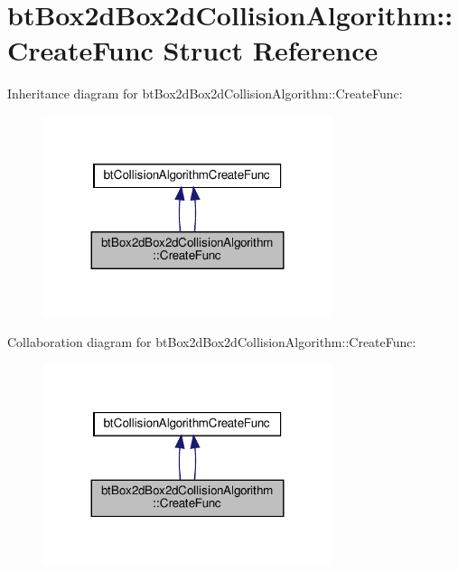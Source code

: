 \hypertarget{structbtBox2dBox2dCollisionAlgorithm_1_1CreateFunc}{}\section{bt\+Box2d\+Box2d\+Collision\+Algorithm\+:\+:Create\+Func Struct Reference}
\label{structbtBox2dBox2dCollisionAlgorithm_1_1CreateFunc}


Inheritance diagram for bt\+Box2d\+Box2d\+Collision\+Algorithm\+:\+:Create\+Func\+:
\nopagebreak
\begin{figure}[H]
\begin{center}
\leavevmode
\includegraphics[width=239pt]{structbtBox2dBox2dCollisionAlgorithm_1_1CreateFunc__inherit__graph}
\end{center}
\end{figure}


Collaboration diagram for bt\+Box2d\+Box2d\+Collision\+Algorithm\+:\+:Create\+Func\+:
\nopagebreak
\begin{figure}[H]
\begin{center}
\leavevmode
\includegraphics[width=239pt]{structbtBox2dBox2dCollisionAlgorithm_1_1CreateFunc__coll__graph}
\end{center}
\end{figure}
